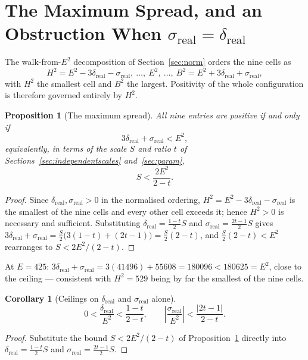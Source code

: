 \documentclass[12pt]{article}
\newtheorem{proposition}[theorem]{Proposition}
\newtheorem{corollary}[theorem]{Corollary}
\theoremstyle{remark}
\begin{document}
\section{The Maximum Spread, and an Obstruction When $\sigma_{\text{real}}=\delta_{\text{real}}$}\label{sec:maxspread}

The walk-from-$E^2$ decomposition of Section~\ref{sec:norm} orders the
nine cells as
\[
H^2=E^2-3\delta_{\text{real}}-\sigma_{\text{real}}, \ \ldots, \ E^2,
\ \ldots, \ B^2=E^2+3\delta_{\text{real}}+\sigma_{\text{real}} ,
\]
with $H^2$ the smallest cell and $B^2$ the largest. Positivity of the
whole configuration is therefore governed entirely by $H^2$.

\begin{proposition}[The maximum spread]\label{prop:maxspread}
All nine entries are positive if and only if
\[
3\delta_{\text{real}} + \sigma_{\text{real}} < E^2 ,
\]
equivalently, in terms of the scale $S$ and ratio $t$ of
Sections~\ref{sec:independentscales} and~\ref{sec:param},
\[
S < \frac{2E^2}{2-t} .
\]
\end{proposition}

\begin{proof}
Since $\delta_{\text{real}},\sigma_{\text{real}}>0$ in the normalised
ordering, $H^2=E^2-3\delta_{\text{real}}-\sigma_{\text{real}}$ is the
smallest of the nine cells and every other cell exceeds it; hence
$H^2>0$ is necessary and sufficient. Substituting
$\delta_{\text{real}}=\tfrac{1-t}{2}S$ and
$\sigma_{\text{real}}=\tfrac{2t-1}{2}S$ gives
$3\delta_{\text{real}}+\sigma_{\text{real}} =
\tfrac{S}{2}\bigl(3(1-t)+(2t-1)\bigr) = \tfrac{S}{2}(2-t)$, and
$\tfrac{S}{2}(2-t) < E^2$ rearranges to $S < 2E^2/(2-t)$.
\end{proof}

At $E=425$: $3\delta_{\text{real}}+\sigma_{\text{real}} =
3(41496)+55608 = 180096 < 180625 = E^2$, close to the ceiling ---
consistent with $H^2=529$ being by far the smallest of the nine cells.

\begin{corollary}[Ceilings on $\delta_{\text{real}}$ and $\sigma_{\text{real}}$ alone]\label{cor:deltasigmaceiling}
\[
0 < \frac{\delta_{\text{real}}}{E^2} < \frac{1-t}{2-t} ,
\qquad
\left\lvert \frac{\sigma_{\text{real}}}{E^2} \right\rvert
< \frac{\lvert 2t-1 \rvert}{2-t} .
\]
\end{corollary}

\begin{proof}
Substitute the bound $S<2E^2/(2-t)$ of
Proposition~\ref{prop:maxspread} directly into
$\delta_{\text{real}}=\tfrac{1-t}{2}S$ and
$\sigma_{\text{real}}=\tfrac{2t-1}{2}S$.
\end{proof}
\end{document}
